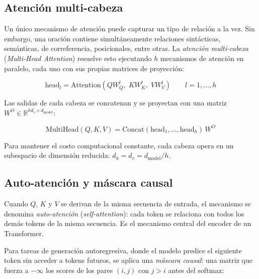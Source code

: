 \subsection{Atención multi-cabeza}
\label{subsec:multihead}

Un único mecanismo de atención puede capturar un tipo de relación a la vez.
Sin embargo, una oración contiene simultáneamente relaciones sintácticas,
semánticas, de correferencia, posicionales, entre otras. La
\textit{atención multi-cabeza} (\textit{Multi-Head Attention}) resuelve
esto ejecutando $h$ mecanismos de atención en paralelo, cada uno con sus
propias matrices de proyección:

\begin{equation}
    \text{head}_l = \text{Attention}(Q W_Q^l,\; K W_K^l,\; V W_V^l)
    \qquad l = 1, \ldots, h
\end{equation}

Las salidas de cada cabeza se concatenan y se proyectan con una matriz
$W^O \in \mathbb{R}^{h d_v \times d_{\text{model}}}$:

\begin{equation}
    \text{MultiHead}(Q, K, V) =
    \text{Concat}(\text{head}_1, \ldots, \text{head}_h)\, W^O
\end{equation}

Para mantener el costo computacional constante, cada cabeza opera en un
subespacio de dimensión reducida: $d_k = d_v = d_{\text{model}} / h$.



\subsection{Auto-atención y máscara causal}
\label{subsec:autoatencion}

Cuando $Q$, $K$ y $V$ se derivan de la misma secuencia de entrada, el
mecanismo se denomina \textit{auto-atención} (\textit{self-attention}):
cada token se relaciona con todos los demás tokens de la misma secuencia.
Es el mecanismo central del encoder de un Transformer.

Para tareas de generación autoregresiva, donde el modelo predice el
siguiente token sin acceder a tokens futuros, se aplica una
\textit{máscara causal}: una matriz que fuerza a $-\infty$ los scores
de los pares $(i, j)$ con $j > i$ antes del softmax:

